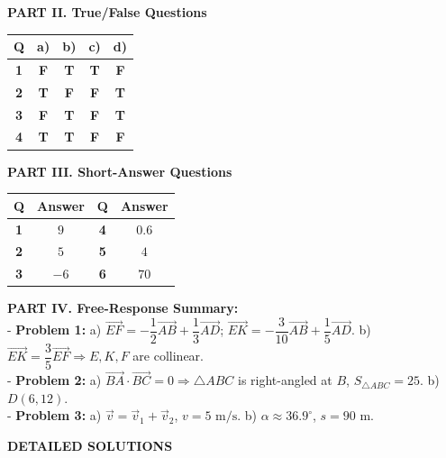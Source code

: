 \documentclass[10pt,a4paper]{article}
\begin{document}
\vspace{1pt}
\noindent\begin{minipage}[t]{0.58\linewidth}
\textbf{PART II. True/False Questions}\\[1.5pt]
\renewcommand{\arraystretch}{1.15}
\begin{tabular}{|c|c|c|c|c|}
\hline
\textbf{Q} & \textbf{a)} & \textbf{b)} & \textbf{c)} & \textbf{d)} \\ \hline
\textbf{1} & \textbf{F} & \textbf{T} & \textbf{T} & \textbf{F} \\ \hline
\textbf{2} & \textbf{T} & \textbf{F} & \textbf{F} & \textbf{T} \\ \hline
\textbf{3} & \textbf{F} & \textbf{T} & \textbf{F} & \textbf{T} \\ \hline
\textbf{4} & \textbf{T} & \textbf{T} & \textbf{F} & \textbf{F} \\ \hline
\end{tabular}
\end{minipage}\hfill
\begin{minipage}[t]{0.40\linewidth}
\textbf{PART III. Short-Answer Questions}\\[1.5pt]
\renewcommand{\arraystretch}{1.15}
\begin{tabular}{|c|c|c|c|}
\hline
\textbf{Q} & \textbf{Answer} & \textbf{Q} & \textbf{Answer} \\ \hline
\textbf{1} & $9$     & \textbf{4} & $0.6$ \\ \hline
\textbf{2} & $5$     & \textbf{5} & $4$ \\ \hline
\textbf{3} & $-6$    & \textbf{6} & $70$ \\ \hline
\end{tabular}
\end{minipage}

\vspace{5pt}
\noindent\textbf{PART IV. Free-Response Summary:}\\[2pt]
- \textbf{Problem 1:} a) $\vec{EF} = -\dfrac{1}{2}\vec{AB} + \dfrac{1}{3}\vec{AD}$; $\vec{EK} = -\dfrac{3}{10}\vec{AB} + \dfrac{1}{5}\vec{AD}$. b) $\vec{EK} = \dfrac{3}{5}\vec{EF} \Rightarrow E, K, F$ are collinear.\\
- \textbf{Problem 2:} a) $\vec{BA}\cdot\vec{BC} = 0 \Rightarrow \triangle ABC$ is right-angled at $B$, $S_{\triangle ABC} = 25$. b) $D(6, 12)$.\\
- \textbf{Problem 3:} a) $\vec{v} = \vec{v}_1 + \vec{v}_2$, $v = 5\text{ m/s}$. b) $\alpha \approx 36.9^\circ$, $s = 90\text{ m}$.

\vspace{4pt}
\begin{center}
  {\large\bfseries\color{ink} DETAILED SOLUTIONS}
\end{center}
\vspace{1pt}
\end{document}

